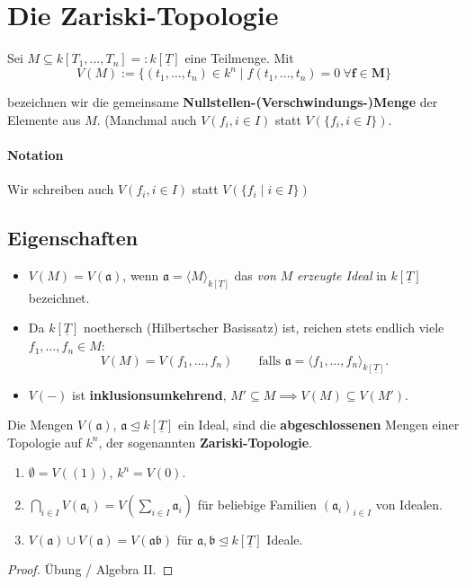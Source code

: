 
\section{Die Zariski-Topologie}
\label{sec:zariski-topologie}

\begin{defn}
  \label{def:verschwindungsmenge}
  Sei $M\subseteq k[T_{1},\ldots,T_{n}]=:k[\underline{T}]$ eine Teilmenge.
  Mit
  \[
    V(M) :=\{(t_{1},\ldots,t_{n})\in k^n \mid f(t_{1},\ldots,t_{n})=0\ \boldsymbol{\forall f\in M}\}
  \]

  bezeichnen wir die gemeinsame \textbf{Nullstellen-(Verschwindungs-)Menge}
  der Elemente aus $M$. (Manchmal auch $V(f_{i},i\in I)$ statt $V(\{f_{i},i\in I\})$.
\end{defn}

\paragraph{Notation}
Wir schreiben auch $V(f_i, i \in I)$ statt $V(\{f_i \mid i \in I\})$

\subsection{Eigenschaften}
\label{subsec:zariski-topologie-eigenschaften}
\begin{itemize}
\item $V(M)=V(\mathfrak{a})$, wenn $\mathfrak{a}=\langle M\rangle_{k[\underline{T}]}$ das
  \emph{von} $M$ \emph{erzeugte Ideal} in $k[\underline{T}]$ bezeichnet.
\item Da $k[\underline{T}]$ noethersch (Hilbertscher Basissatz) ist, reichen
  stets endlich viele $f_{1},\ldots,f_{n}\in M$:
  \[
    V(M)=V(f_{1},\ldots,f_{n})\qquad\text{falls }\mathfrak{a}=\langle f_{1},\ldots,f_{n}\rangle_{k[\underline{T}]}.
  \]
\item $V(-)$ ist \textbf{inklusionsumkehrend}, $M'\subseteq M\implies V(M)\subseteq V(M')$.
\end{itemize}
\begin{prop}
  \label{propdef:zariski-topologie}
  Die Mengen $V(\mathfrak{a})$, $\mathfrak{a} \unlhd k[\underline{T}]$
  ein Ideal, sind die \textbf{abgeschlossenen} Mengen einer Topologie
  auf $k^{n}$, der sogenannten \textbf{Zariski-Topologie}.
  \begin{enumerate}
  \item $\emptyset=V\left((1)\right)$, $k^{n}=V(0)$. 
  \item $\bigcap_{i\in I}V(\mathfrak{a}_{i})=V\left(\sum_{i\in I}\mathfrak{a}_{i}\right)$
    für beliebige Familien $(\mathfrak{a}_{i})_{i \in I}$ von Idealen.
  \item $V(\mathfrak{a})\cup V(\mathfrak{a})=V(\mathfrak{ab})$ für $\mathfrak{a},\mathfrak{b}\unlhd k[\underline{T}]$
    Ideale.
  \end{enumerate}
\end{prop}
\begin{proof}
  Übung / Algebra II. 

  \-
\end{proof}

